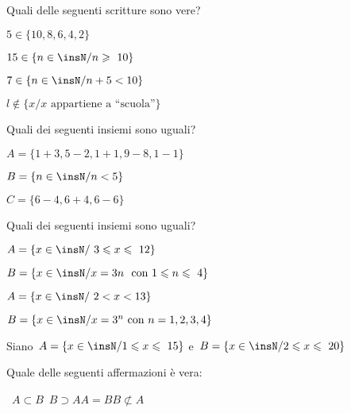\begin{esercizio}
\label{ese:6.30}
Quali delle seguenti scritture sono vere?
\begin{multicols}{2}
\begin{enumeratea}
\item $5\in \{10,8,6,4,2\}$\hfill\boxV\quad\boxF
\item $15\in \{n\in\insN/n\geqslant~10\}$\hfill\boxV\quad\boxF
\item $7\in \{n\in\insN/n+5<10\}$\hfill\boxV\quad\boxF
\item $l\notin\{x/x\text{ appartiene a ``scuola''}\}$\hfill\boxV\quad\boxF
\end{enumeratea}
\end{multicols}
\end{esercizio}

\begin{esercizio}
\label{ese:6.31}
Quali dei seguenti insiemi sono uguali?
\begin{multicols}{2}
 \begin{enumeratea}
 \item $A=\{1+3, 5-2, 1+1, 9-8, 1-1\}$
\item $B=\{n\in\insN/n<5\}$
\item $C=\{6-4, 6+4, 6-6\}$
 \end{enumeratea}
\end{multicols}
\end{esercizio}

\newpage %

\begin{esercizio}
\label{ese:6.32}
Quali dei seguenti insiemi sono uguali?
\begin{multicols}{2}
\begin{enumeratea}
\item $A=\{x\in\insN/\ 3\leqslant x\leqslant~12\}$
\item $B=\{x\in\insN/x=3n\ \text{ con } 1\leqslant n\leqslant~4\}$
\item $A=\{x\in\insN/\ 2<x<13\}$
\item $B=\{x\in\insN/x=3^{n}\text{ con }n=1,2,3,4\}$
\end{enumeratea}
\end{multicols}
\end{esercizio}

\begin{esercizio}
\label{ese:7.39}
Siano~$A=\{x\in\insN/1\leqslant x\leqslant~15\}$ e~$B=\{x\in\insN/2\leqslant 
x\leqslant~20\}$
\begin{center}

\end{center}
Quale delle seguenti affermazioni è vera:
\begin{center}
\boxA\quad~$A\subset B$\quad\boxB\quad~$B\supset 
A$\quad\boxC\quad$A=B$\quad\boxD\quad$B\not\subset A$
\end{center}
\end{esercizio}

